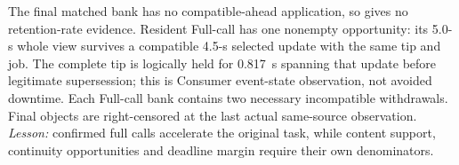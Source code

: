 The final matched bank has no compatible-ahead application, so gives no
retention-rate evidence. Resident Full-call has one nonempty opportunity:
its 5.0-s whole view survives a compatible 4.5-s selected update with the
same tip and job. The complete tip is logically held for 0.817~s spanning
that update before legitimate supersession; this is Consumer event-state
observation, not avoided downtime. Each Full-call bank contains two
necessary incompatible withdrawals. Final objects are right-censored at
the last actual same-source observation. \emph{Lesson:} confirmed full
calls accelerate the original task, while content support, continuity
opportunities and deadline margin require their own denominators.
